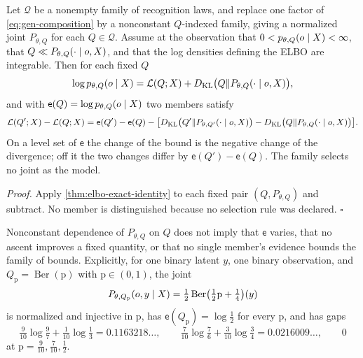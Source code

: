 Let $\mathcal Q$ be a nonempty family of recognition laws, and replace one
factor of \eqref{eq:gen-composition} by a nonconstant $Q$-indexed family, giving
a normalized joint $P_{\theta,Q}$ for each $Q\in\mathcal Q$. Assume at the
observation that $0<p_{\theta,Q}(o\mid X)<\infty$, that
$Q\ll P_{\theta,Q}(\cdot\mid o,X)$, and that the log densities defining the
ELBO are integrable. Then for each fixed $Q$
\begin{equation}
\log p_{\theta,Q}(o\mid X)=\mathcal L(Q;X)
+D_{\mathrm{KL}}\bigl(Q\Vert P_{\theta,Q}(\cdot\mid o,X)\bigr),
\label{eq:gen-moving-target}
\end{equation}
and with $\mathsf e(Q)=\log p_{\theta,Q}(o\mid X)$ two members satisfy
\begin{equation}
\mathcal L(Q';X)-\mathcal L(Q;X)
=\mathsf e(Q')-\mathsf e(Q)
-\bigl[D_{\mathrm{KL}}\bigl(Q'\Vert P_{\theta,Q'}(\cdot\mid o,X)\bigr)
-D_{\mathrm{KL}}\bigl(Q\Vert P_{\theta,Q}(\cdot\mid o,X)\bigr)\bigr].
\label{eq:gen-elbo-difference}
\end{equation}
On a level set of $\mathsf e$ the change of the bound is the negative change of
the divergence; off it the two changes differ by $\mathsf e(Q')-\mathsf e(Q)$.
The family selects no joint as the model. 

\noindent\emph{Proof.}
Apply \cref{thm:elbo-exact-identity} to each fixed pair $(Q,P_{\theta,Q})$ and
subtract. No member is distinguished because no selection rule was declared.
\hfill$\square$

Nonconstant dependence of $P_{\theta,Q}$ on $Q$ does not imply that $\mathsf e$
varies, that no ascent improves a fixed quantity, or that no single member's
evidence bounds the family of bounds. Explicitly, for one binary latent $y$, one
binary observation, and $Q_{\mathrm p}=\operatorname{Ber}(\mathrm p)$ with
$\mathrm p\in(0,1)$, the joint
\begin{equation}
P_{\theta,Q_{\mathrm p}}(o,y\mid X)=\tfrac12\operatorname{Ber}\bigl(\tfrac12\mathrm p+\tfrac14\bigr)(y)
\label{eq:gen-moving-target-witness}
\end{equation}
is normalized and injective in $\mathrm p$, has $\mathsf e(Q_{\mathrm p})=\log\tfrac12$
for every $\mathrm p$, and has gaps
\begin{equation}
\tfrac9{10}\log\tfrac97+\tfrac1{10}\log\tfrac13=0.1163218\ldots,
\qquad
\tfrac7{10}\log\tfrac76+\tfrac3{10}\log\tfrac34=0.0216009\ldots,
\qquad
0
\label{eq:gen-moving-target-values}
\end{equation}
at $\mathrm p=\tfrac9{10},\tfrac7{10},\tfrac12$. 

